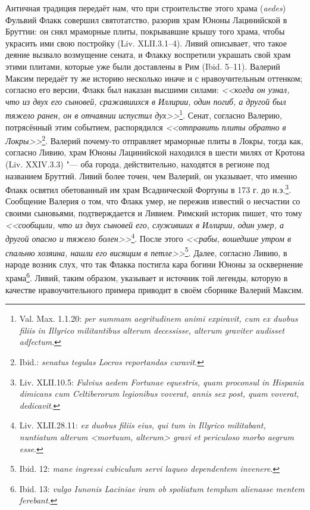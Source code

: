 Античная традиция передаёт нам, что при строительстве этого храма (\textit{aedes}) Фульвий Флакк совершил святотатство, разорив храм Юноны Лацинийской в Бруттии: он снял мраморные плиты, покрывавшие крышу того храма, чтобы украсить ими свою постройку (Liv. XLII.3.1--4). Ливий описывает, что такое деяние вызвало возмущение сената, и Флакку воспретили украшать свой храм этими плитами, которые уже были доставлены в Рим (Ibid. 5--11). Валерий Максим передаёт ту же историю несколько иначе и с нравоучительным оттенком; согласно его версии, Флакк был наказан высшими силами: \textit{<<когда он узнал, что из двух его сыновей, сражавшихся в Иллирии, один погиб, а другой был тяжело ранен, он в отчаянии испустил дух>>}\footnote{Val. Max. 1.1.20: \textit{per summam aegritudinem animi expiravit, cum ex duobus filiis in Illyrico militantibus alterum decessisse, alterum graviter audisset adfectum}.}. Сенат, согласно Валерию, потрясённый этим событием, распорядился \textit{<<отправить плиты обратно в Локры>>}\footnote{Ibid.: \textit{senatus tegulas Locros reportandas curavit}.}. Валерий почему-то отправляет мраморные плиты в Локры, тогда как, согласно Ливию, храм Юноны Лацинийской находился в шести милях от Кротона (Liv. XXIV.3.3) "--- оба города, действительно, находятся в регионе под названием Бруттий. Ливий более точен, чем Валерий, он указывает, что именно Флакк освятил обетованный им храм Всаднической Фортуны в 173 г. до н.э.\footnote{Liv. XLII.10.5: \textit{Fulvius aedem Fortunae equestris, quam proconsul in Hispania dimicans cum Celtiberorum legionibus voverat, annis sex post, quam voverat, dedicavit}.}. Сообщение Валерия о том, что Флакк умер, не пережив известий о несчастии со своими сыновьями, подтверждается и Ливием. Римский историк пишет, что тому \textit{<<сообщили, что из двух сыновей его, служивших в Иллирии, один умер, а другой опасно и тяжело болен>>}\footnote{Liv. XLII.28.11: \textit{ex duobus filiis eius, qui tum in Illyrico militabant, nuntiatum alterum <mortuum, alterum> gravi et periculoso morbo aegrum esse}.}. После этого \textit{<<рабы, вошедшие утром в спальню хозяина, нашли его висящим в петле>>}\footnote{Ibid. 12: \textit{mane ingressi cubiculum servi laqueo dependentem invenere}.}. Далее, согласно Ливию, в народе возник слух, что так Флакка постигла кара богини Юноны за осквернение храма\footnote{Ibid. 13: \textit{vulgo Iunonis Laciniae iram ob spoliatum templum alienasse mentem ferebant}.}. Ливий, таким образом, указывает и источник той легенды, которую в качестве нравоучительного примера приводит в своём сборнике Валерий Максим.

